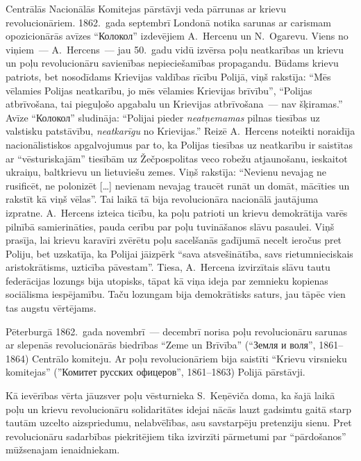 \documentclass[twoside,a5paper,12pt,fleqn,openany]{extbook}
\newcommand{\rutxti}[1]{\textrussian{#1}}
\newcommand{\citespace}{[\dots{}]}
\begin{document}
Centrālās Nacionālās Komitejas pārstāvji veda pārrunas ar krievu revolucionāriem. 1862.~gada septembrī Londonā notika sarunas ar carismam opozicionārās avīzes ``\rutxti{Колокол}'' izdevējiem A.~Hercenu un N.~Ogarevu. Viens no viņiem~--- A.~Hercens~--- jau 50.~gadu vidū izvērsa poļu neatkarības un krievu un poļu revolucionāru savienības nepieciešamības propagandu. Būdams krievu patriots, bet nosodīdams Krievijas valdības rīcību Polijā, viņš rakstīja: ``Mēs vēlamies Polijas neatkarību, jo mēs vēlamies Krievijas brīvību'', ``Polijas atbrīvošana, tai pieguļošo apgabalu un Krievijas atbrīvošana~--- nav šķiramas.'' Avīze ``\rutxti{Колокол}'' sludināja: ``Polijai pieder \emph{neatņemamas} pilnas tiesības uz valstisku patstāvību, \emph{neatkarīgu} no Krievijas.'' Reizē A.~Hercens noteikti noraidīja nacionālistiskos apgalvojumus par to, ka Polijas tiesības uz neatkarību ir saistītas ar ``vēsturiskajām'' tiesībām uz Žečpospolitas veco robežu atjaunošanu, ieskaitot ukraiņu, baltkrievu un lietuviešu zemes. Viņš rakstīja: ``Nevienu nevajag ne rusificēt, ne polonizēt \citespace{} nevienam nevajag traucēt runāt un domāt, mācīties un rakstīt kā viņš vēlas''. Tai laikā tā bija revolucionāra nacionālā jautājuma izpratne. A.~Hercens izteica ticību, ka poļu patrioti un krievu demokrātija varēs pilnībā samierināties, pauda cerību par poļu tuvināšanos slāvu pasaulei. Viņš prasīja, lai krievu karavīri zvērētu poļu sacelšanās gadījumā necelt ieročus pret Poliju, bet uzskatīja, ka Polijai jāizpērk ``sava atsvešinātība, savs rietumnieciskais aristokrātisms, uzticība pāvestam''. Tiesa, A.~Hercena izvirzītais slāvu tautu federācijas lozungs bija utopisks, tāpat kā viņa ideja par zemnieku kopienas sociālisma iespējamību. Taču lozungam bija demokrātisks saturs, jau tāpēc vien tas augstu vērtējams.

Pēterburgā 1862.~gada novembrī~--- decembrī norisa poļu revolucionāru sarunas ar slepenās revolucionārās biedrības ``Zeme un Brīvība'' (``\rutxti{Земля и воля}'', 1861--1864) Centrālo komiteju. Ar poļu revolucionāriem bija saistīti ``Krievu virsnieku komitejas'' (''\rutxti{Комитет русских офицеров}'', 1861--1863) Polijā pārstāvji.

Kā ievērības vērta jāuzsver poļu vēsturnieka S.~Keņēviča doma, ka šajā laikā poļu un krievu revolucionāru solidaritātes idejai nācās lauzt gadsimtu gaitā starp tautām uzcelto aizspriedumu, nelabvēlības, asu savstarpēju pretenziju sienu. Pret revolucionāru sadarbības piekritējiem tika izvirzīti pārmetumi par ``pārdošanos'' mūžsenajam ienaidniekam.
\end{document}
